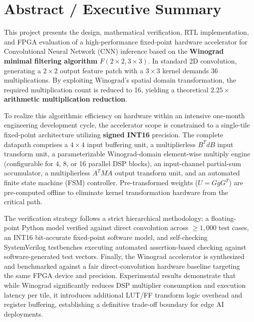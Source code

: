 \documentclass[12pt,a4paper]{article}
\begin{document}
\newpage
\setcounter{page}{1}

\section*{Abstract / Executive Summary}

This project presents the design, mathematical verification, RTL implementation, and FPGA evaluation of a high-performance fixed-point hardware accelerator for Convolutional Neural Network (CNN) inference based on the \textbf{Winograd minimal filtering algorithm} $F(2 \times 2, 3 \times 3)$. In standard 2D convolution, generating a $2 \times 2$ output feature patch with a $3 \times 3$ kernel demands 36 multiplications. By exploiting Winograd's spatial domain transformation, the required multiplication count is reduced to 16, yielding a theoretical \textbf{$2.25\times$ arithmetic multiplication reduction}.

To realize this algorithmic efficiency on hardware within an intensive one-month engineering development cycle, the accelerator scope is constrained to a single-tile fixed-point architecture utilizing \textbf{signed INT16} precision. The complete datapath comprises a $4 \times 4$ input buffering unit, a multiplierless $B^T d B$ input transform unit, a parameterizable Winograd-domain element-wise multiply engine (configurable for 4, 8, or 16 parallel DSP blocks), an input-channel partial-sum accumulator, a multiplierless $A^T M A$ output transform unit, and an automated finite state machine (FSM) controller. Pre-transformed weights ($U = G g G^T$) are pre-computed offline to eliminate kernel transformation hardware from the critical path.

The verification strategy follows a strict hierarchical methodology: a floating-point Python model verified against direct convolution across $\ge 1,000$ test cases, an INT16 bit-accurate fixed-point software model, and self-checking SystemVerilog testbenches executing automated assertion-based checking against software-generated test vectors. Finally, the Winograd accelerator is synthesized and benchmarked against a fair direct-convolution hardware baseline targeting the same FPGA device and precision. Experimental results demonstrate that while Winograd significantly reduces DSP multiplier consumption and execution latency per tile, it introduces additional LUT/FF transform logic overhead and register buffering, establishing a definitive trade-off boundary for edge AI deployments.
\end{document}
